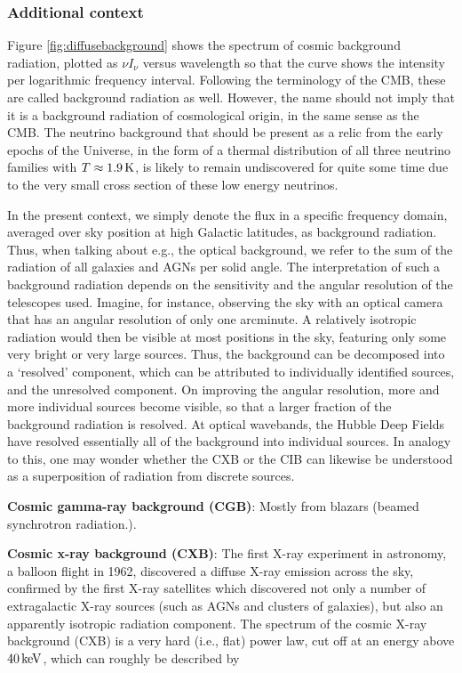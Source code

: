 \documentclass[a4paper,10pt]{article}
\begin{document}
\subsubsection{Additional context}

Figure \ref{fig:diffusebackground} shows the spectrum of cosmic background radiation, plotted as $\nu I_\nu$ versus wavelength so that the curve shows the intensity per logarithmic frequency interval. Following the terminology of the CMB, these are called background radiation as well. However, the name should not imply that it is a background radiation of cosmological origin, in the same sense as the CMB. The neutrino background that should be present as a relic from the early epochs of the Universe, in the form of a thermal distribution of all three neutrino families with $T\approx1.9\,{\rm K}$, is likely to remain undiscovered for quite some time due to the very small cross section of these low energy neutrinos.

{\noindent}In the present context, we simply denote the flux in a specific frequency domain, averaged over sky position at high Galactic latitudes, as background radiation. Thus, when talking about e.g., the optical background, we refer to the sum of the radiation of all galaxies and AGNs per solid angle. The interpretation of such a background radiation depends on the sensitivity and the angular resolution of the telescopes used. Imagine, for instance, observing the sky with an optical camera that has an angular resolution of only one arcminute. A relatively isotropic radiation would then be visible at most positions in the sky, featuring only some very bright or very large sources. Thus, the background can be decomposed into a `resolved' component, which can be attributed to individually identified sources, and the unresolved component. On improving the angular resolution, more and more individual sources become visible, so that a larger fraction of the background radiation is resolved. At optical wavebands, the Hubble Deep Fields have resolved essentially all of the background into individual sources. In analogy to this, one may wonder whether the CXB or the CIB can likewise be understood as a superposition of radiation from discrete sources.

{\noindent}\textbf{Cosmic gamma-ray background (CGB)}: Mostly from blazars (beamed synchrotron radiation.).

{\noindent}\textbf{Cosmic x-ray background (CXB)}: The first X-ray experiment in astronomy, a balloon flight in 1962, discovered a diffuse X-ray emission across the sky, confirmed by the first X-ray satellites which discovered not only a number of extragalactic X-ray sources (such as AGNs and clusters of galaxies), but also an apparently isotropic radiation component. The spectrum of the cosmic X-ray background (CXB) is a very hard (i.e., flat) power law, cut off at an energy above $40\,{\rm keV}$, which can roughly be described by
\end{document}
